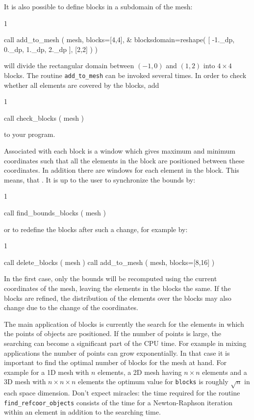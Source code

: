It is also possible to define blocks in a subdomain of the mesh:
\begin{listing}{1}

  call add_to_mesh ( mesh, blocks=[4,4], &
    blocksdomain=reshape( [ -1._dp, 0._dp, 1._dp, 2._dp ], [2,2] )  )

\end{listing}
will divide the rectangular domain between $(-1,0)$ and $(1,2)$ into $4\times4$
blocks. The routine \texttt{add\_to\_mesh} can be invoked several times. In
order to check whether all elements are covered by the blocks, add
\begin{listing}{1}

  call check_blocks ( mesh )

\end{listing}
to your program.

Associated with each block is a window which gives maximum and minimum
coordinates such that all the elements in the block are positioned between
these coordinates. In addition there are windows for each element in the
block. This means, that . It is 
up to the user to synchronize the bounds by:
\begin{listing}{1}

  call find_bounds_blocks ( mesh )

\end{listing}
or to redefine the blocks after such a change, for example by:
\begin{listing}{1}

  call delete_blocks ( mesh )
  call add_to_mesh ( mesh, blocks=[8,16] )

\end{listing}
In the first case, only the bounds will be recomputed using the current
coordinates of the mesh, leaving the elements in the blocks the same. If the
blocks are refined, the distribution of the elements over the blocks may also
change due to the change of the coordinates.

The main application of blocks is currently the search for the elements in which
the points of objects are positioned. If the number of points is large, the
searching can become a significant part of the CPU time. For example in mixing
applications the number of points can grow exponentially. In that case it is
important to find the optimal number of blocks for the mesh at hand. For
example for a 1D mesh with $n$ elements, a 2D mesh having $n\times n$ elements
and a 3D mesh with $n\times n\times n$ elements the optimum value for 
\texttt{blocks} is roughly $\sqrt{n}$ in each space dimension. Don't expect
miracles: the time required for the routine \texttt{find\_refcoor\_objects}
consists of the time for a Newton-Raphson iteration within an element in
addition to the searching time.

